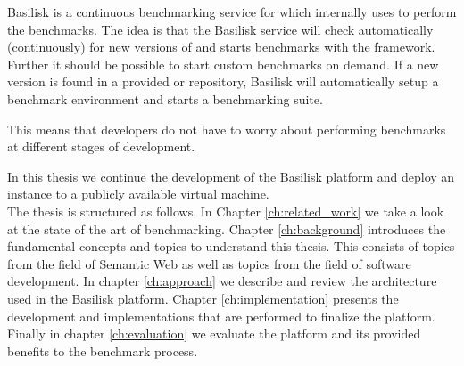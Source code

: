 Basilisk is a continuous benchmarking service for \tsp{} which internally uses \iguana{} to perform the benchmarks.
The idea is that the Basilisk service will check automatically (continuously) for new versions of \tsp{} and starts benchmarks with the \iguana{} framework.
Further it should be possible to start custom benchmarks on demand.
If a new version is found in a provided \gh{} or \dockh{} repository, Basilisk will automatically setup a benchmark environment and starts a benchmarking suite.

This means that developers do not have to worry about performing benchmarks at different stages of development.

In this thesis we continue the development of the Basilisk platform and deploy an instance to a publicly available virtual machine.
\\

The thesis is structured as follows. 
In Chapter \ref{ch:related_work} we take a look at the state of the art of \ts{} benchmarking. 
Chapter \ref{ch:background} introduces the fundamental concepts and topics to understand this thesis.
This consists of topics from the field of Semantic Web as well as topics from the field of software development.
In chapter \ref{ch:approach} we describe and review the architecture used in the Basilisk platform.
Chapter \ref{ch:implementation} presents the development and implementations that are performed to finalize the platform.
Finally in chapter \ref{ch:evaluation} we evaluate the platform and its provided benefits to the \ts{} benchmark process.

